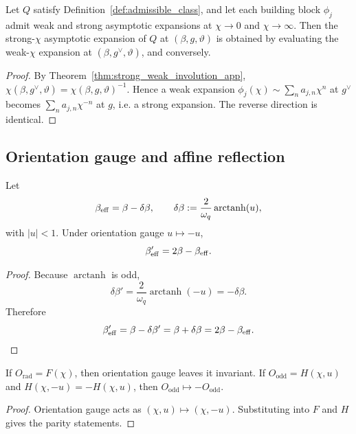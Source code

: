 \begin{proposition}
\label{prop:asymptotic_exchange_app}
Let \(Q\) satisfy Definition~\ref{def:admissible_class}, and let each building block
\(\phi_j\) admit weak and strong asymptotic expansions at \(\chi\to0\) and \(\chi\to\infty\).
Then the strong-\(\chi\) asymptotic expansion of \(Q\) at \((\beta,g,\vartheta)\) is obtained by
evaluating the weak-\(\chi\) expansion at \((\beta,g^\vee,\vartheta)\), and conversely.
\end{proposition}
\begin{proof}
By Theorem~\ref{thm:strong_weak_involution_app},
\(\chi(\beta,g^\vee,\vartheta)=\chi(\beta,g,\vartheta)^{-1}\).
Hence a weak expansion
\(\phi_j(\chi)\sim\sum_n a_{j,n}\chi^n\) at \(g^\vee\) becomes
\(\sum_n a_{j,n}\chi^{-n}\) at \(g\), i.e. a strong expansion.
The reverse direction is identical.
\end{proof}

\subsection{Orientation gauge and affine reflection}

\begin{lemma}
\label{lem:affine_reflection_app}
Let
\begin{equation}
  \beta_{\mathrm{eff}}=\beta-\delta\beta,
  \qquad
  \delta\beta:=\frac{2}{\omega_q}\operatorname{arctanh}(u),
\end{equation}
with \(|u|<1\).
Under orientation gauge \(u\mapsto-u\),
\begin{equation}
  \beta_{\mathrm{eff}}' = 2\beta-\beta_{\mathrm{eff}}.
\end{equation}
\end{lemma}
\begin{proof}
Because \(\operatorname{arctanh}\) is odd,
\begin{equation}
  \delta\beta'=
  \frac{2}{\omega_q}\operatorname{arctanh}(-u)
  =-\delta\beta.
\end{equation}
Therefore
\begin{equation}
  \beta_{\mathrm{eff}}' = \beta-\delta\beta' = \beta+\delta\beta = 2\beta-\beta_{\mathrm{eff}}.
\end{equation}
\end{proof}

\begin{lemma}
\label{lem:even_odd_split_app}
If \(O_{\mathrm{rad}}=F(\chi)\), then orientation gauge leaves it invariant.
If \(O_{\mathrm{odd}}=H(\chi,u)\) and \(H(\chi,-u)=-H(\chi,u)\), then
\(O_{\mathrm{odd}}\mapsto -O_{\mathrm{odd}}\).
\end{lemma}
\begin{proof}
Orientation gauge acts as \((\chi,u)\mapsto(\chi,-u)\).
Substituting into \(F\) and \(H\) gives the parity statements.
\end{proof}

